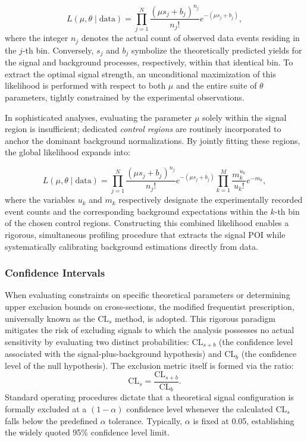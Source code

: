 \begin{equation}
\label{eqn:likelihood}
L(\mu,\theta \mid \text{data}) = \prod_{j=1}^{N} \frac{(\mu s_j + b_j)^{n_j}}{n_j!} e^{-(\mu s_j + b_j)},
\end{equation}
where the integer $n_j$ denotes the actual count of observed data events residing in the $j$-th bin. Conversely, $s_j$ and $b_j$ symbolize the theoretically predicted yields for the signal and background processes, respectively, within that identical bin. To extract the optimal signal strength, an unconditional maximization of this likelihood is performed with respect to both $\mu$ and the entire suite of $\theta$ parameters, tightly constrained by the experimental observations.

In sophisticated analyses, evaluating the parameter $\mu$ solely within the signal region is insufficient; dedicated \textit{control regions} are routinely incorporated to anchor the dominant background normalizations. By jointly fitting these regions, the global likelihood expands into:

\begin{equation}
\label{eqn:likelihood2}
L(\mu,\theta \mid \text{data}) = \prod_{j=1}^{N} \frac{(\mu s_j + b_j)^{n_j}}{n_j!} e^{-(\mu s_j + b_j)}
\prod_{k=1}^{M} \frac{m_k^{u_k}}{u_k!} e^{-m_k},
\end{equation}
where the variables $u_k$ and $m_k$ respectively designate the experimentally recorded event counts and the corresponding background expectations within the $k$-th bin of the chosen control regions. Constructing this combined likelihood enables a rigorous, simultaneous profiling procedure that extracts the signal POI while systematically calibrating background estimations directly from data.

\subsubsection{Confidence Intervals}
\label{sec:CL}

When evaluating constraints on specific theoretical parameters or determining upper exclusion bounds on cross-sections, the modified frequentist prescription, universally known as the $\text{CL}_s$ method, is adopted. This rigorous paradigm mitigates the risk of excluding signals to which the analysis possesses no actual sensitivity by evaluating two distinct probabilities: $\text{CL}_{s+b}$ (the confidence level associated with the signal-plus-background hypothesis) and $\text{CL}_b$ (the confidence level of the null hypothesis). The exclusion metric itself is formed via the ratio:
\[
\text{CL}_s = \frac{\text{CL}_{s+b}}{\text{CL}_b}.
\]
Standard operating procedures dictate that a theoretical signal configuration is formally excluded at a $(1-\alpha)$ confidence level whenever the calculated $\text{CL}_s$ falls below the predefined $\alpha$ tolerance. Typically, $\alpha$ is fixed at 0.05, establishing the widely quoted 95\% confidence level limit.

